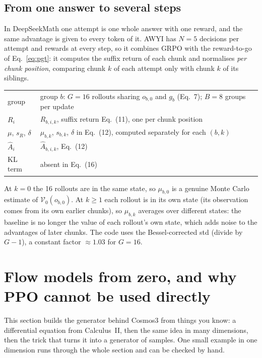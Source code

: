 \documentclass[11pt,a4paper]{article}
\newcommand{\Ah}{\hat A}
\newcommand{\Vf}{\mathcal{V}}
\begin{document}
\subsection{From one answer to several steps}
In DeepSeekMath one attempt is one whole answer with one reward, and the same advantage is given to every token of it. AWYI has $N=5$ decisions per attempt and rewards at every step, so it combines GRPO with the reward-to-go of Eq.~\eqref{eq:pgt}: it computes the suffix return of each chunk and normalises \emph{per chunk position}, comparing chunk $k$ of each attempt only with chunk $k$ of its siblings.

\begin{paperlink}
\begin{tabular}{@{}l p{11cm}@{}}
group & group $b$: $G=16$ rollouts sharing $o_{b,0}$ and $g_b$ (Eq.~7); $B=8$ groups per update\\
$R_i$ & $R_{b,i,k}$, suffix return Eq.~(11), one per chunk position\\
$\mu$, $s_R$, $\delta$ & $\mu_{b,k}$, $s_{b,k}$, $\delta$ in Eq.~(12), computed separately for each $(b,k)$\\
$\Ah_i$ & $\Ah_{b,i,k}$, Eq.~(12)\\
KL term & absent in Eq.~(16)\\
\end{tabular}

\smallskip
At $k=0$ the 16 rollouts are in the same state, so $\mu_{b,0}$ is a genuine Monte Carlo estimate of $\Vf_0(o_{b,0})$. At $k\ge1$ each rollout is in its own state (its observation comes from its own earlier chunks), so $\mu_{b,k}$ averages over different states: the baseline is no longer the value of each rollout's own state, which adds noise to the advantages of later chunks. The code uses the Bessel-corrected std (divide by $G-1$), a constant factor $\approx1.03$ for $G=16$.
\end{paperlink}

\section{Flow models from zero, and why PPO cannot be used directly}\label{sec:flow}
This section builds the generator behind Cosmos3 from things you know: a differential equation from Calculus~II, then the same idea in many dimensions, then the trick that turns it into a generator of samples. One small example in one dimension runs through the whole section and can be checked by hand.
\end{document}
